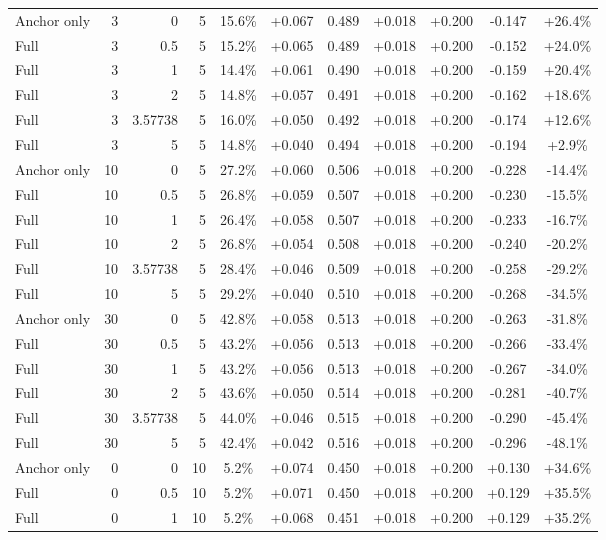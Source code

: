 \begin{table}[htbp]
\begin{tabular}{lrrrccccccc}
Anchor only & 3 & 0 & 5 & 15.6\% & +0.067 & 0.489 & +0.018 & +0.200 & -0.147 & +26.4\% \\
Full & 3 & 0.5 & 5 & 15.2\% & +0.065 & 0.489 & +0.018 & +0.200 & -0.152 & +24.0\% \\
Full & 3 & 1 & 5 & 14.4\% & +0.061 & 0.490 & +0.018 & +0.200 & -0.159 & +20.4\% \\
Full & 3 & 2 & 5 & 14.8\% & +0.057 & 0.491 & +0.018 & +0.200 & -0.162 & +18.6\% \\
Full & 3 & 3.57738 & 5 & 16.0\% & +0.050 & 0.492 & +0.018 & +0.200 & -0.174 & +12.6\% \\
Full & 3 & 5 & 5 & 14.8\% & +0.040 & 0.494 & +0.018 & +0.200 & -0.194 & +2.9\% \\
Anchor only & 10 & 0 & 5 & 27.2\% & +0.060 & 0.506 & +0.018 & +0.200 & -0.228 & -14.4\% \\
Full & 10 & 0.5 & 5 & 26.8\% & +0.059 & 0.507 & +0.018 & +0.200 & -0.230 & -15.5\% \\
Full & 10 & 1 & 5 & 26.4\% & +0.058 & 0.507 & +0.018 & +0.200 & -0.233 & -16.7\% \\
Full & 10 & 2 & 5 & 26.8\% & +0.054 & 0.508 & +0.018 & +0.200 & -0.240 & -20.2\% \\
Full & 10 & 3.57738 & 5 & 28.4\% & +0.046 & 0.509 & +0.018 & +0.200 & -0.258 & -29.2\% \\
Full & 10 & 5 & 5 & 29.2\% & +0.040 & 0.510 & +0.018 & +0.200 & -0.268 & -34.5\% \\
Anchor only & 30 & 0 & 5 & 42.8\% & +0.058 & 0.513 & +0.018 & +0.200 & -0.263 & -31.8\% \\
Full & 30 & 0.5 & 5 & 43.2\% & +0.056 & 0.513 & +0.018 & +0.200 & -0.266 & -33.4\% \\
Full & 30 & 1 & 5 & 43.2\% & +0.056 & 0.513 & +0.018 & +0.200 & -0.267 & -34.0\% \\
Full & 30 & 2 & 5 & 43.6\% & +0.050 & 0.514 & +0.018 & +0.200 & -0.281 & -40.7\% \\
Full & 30 & 3.57738 & 5 & 44.0\% & +0.046 & 0.515 & +0.018 & +0.200 & -0.290 & -45.4\% \\
Full & 30 & 5 & 5 & 42.4\% & +0.042 & 0.516 & +0.018 & +0.200 & -0.296 & -48.1\% \\
Anchor only & 0 & 0 & 10 & 5.2\% & +0.074 & 0.450 & +0.018 & +0.200 & +0.130 & +34.6\% \\
Full & 0 & 0.5 & 10 & 5.2\% & +0.071 & 0.450 & +0.018 & +0.200 & +0.129 & +35.5\% \\
Full & 0 & 1 & 10 & 5.2\% & +0.068 & 0.451 & +0.018 & +0.200 & +0.129 & +35.2\% \\

\end{tabular}
\end{table}
